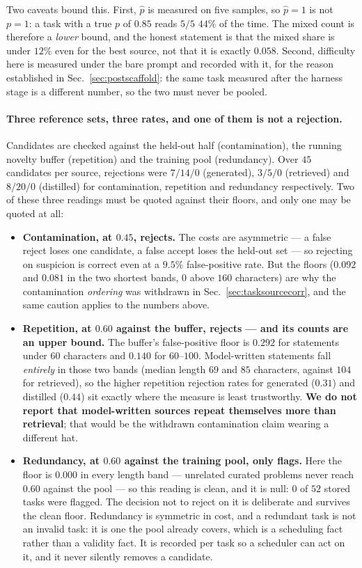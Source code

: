 Two caveats bound this. First, $\hat{p}$ is measured on five samples, so $\hat{p}=1$ is not
$p=1$: a task with a true $p$ of $0.85$ reads $5/5$ $44\%$ of the time. The mixed count is
therefore a \emph{lower} bound, and the honest statement is that the mixed share is under
$12\%$ even for the best source, not that it is exactly $0.058$. Second, difficulty here is
measured under the bare prompt and recorded with it, for the reason established in
Sec.~\ref{sec:postscaffold}: the same task measured after the harness stage is a different
number, so the two must never be pooled.

\paragraph{Three reference sets, three rates, and one of them is not a rejection.} Candidates
are checked against the held-out half (contamination), the running novelty buffer (repetition)
and the training pool (redundancy). Over $45$ candidates per source, rejections were $7/14/0$
(generated), $3/5/0$ (retrieved) and $8/20/0$ (distilled) for contamination, repetition and
redundancy respectively. Two of these three readings must be quoted against their floors, and
only one may be quoted at all:

\begin{itemize}
\item \textbf{Contamination, at $0.45$, rejects.} The costs are asymmetric --- a false reject
loses one candidate, a false accept loses the held-out set --- so rejecting on suspicion is
correct even at a $9.5\%$ false-positive rate. But the floors ($0.092$ and $0.081$ in the two
shortest bands, $0$ above $160$ characters) are why the contamination \emph{ordering} was
withdrawn in Sec.~\ref{sec:tasksourcecorr}, and the same caution applies to the numbers above.
\item \textbf{Repetition, at $0.60$ against the buffer, rejects --- and its counts are an upper
bound.} The buffer's false-positive floor is $0.292$ for statements under $60$ characters and
$0.140$ for $60$--$100$. Model-written statements fall \emph{entirely} in those two bands
(median length $69$ and $85$ characters, against $104$ for retrieved), so the higher repetition
rejection rates for generated ($0.31$) and distilled ($0.44$) sit exactly where the measure is
least trustworthy. \textbf{We do not report that model-written sources repeat themselves more
than retrieval}; that would be the withdrawn contamination claim wearing a different hat.
\item \textbf{Redundancy, at $0.60$ against the training pool, only flags.} Here the floor is
$0.000$ in every length band --- unrelated curated problems never reach $0.60$ against the pool
--- so this reading is clean, and it is null: $0$ of $52$ stored tasks were flagged. The
decision not to reject on it is deliberate and survives the clean floor. Redundancy is
symmetric in cost, and a redundant task is not an invalid task: it is one the pool already
covers, which is a scheduling fact rather than a validity fact. It is recorded per task so a
scheduler can act on it, and it never silently removes a candidate.
\end{itemize}

